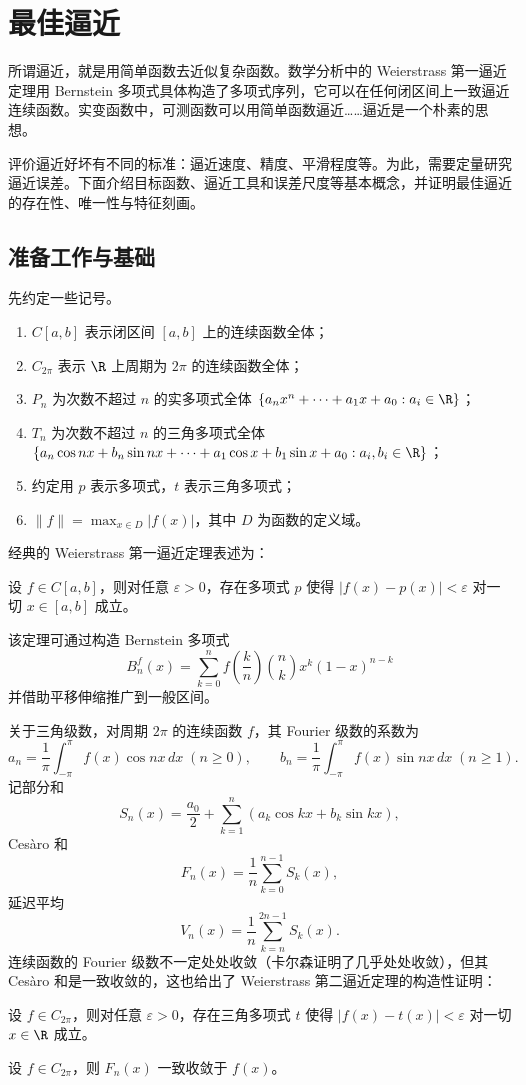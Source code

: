 \section{最佳逼近}

所谓逼近，就是用简单函数去近似复杂函数。数学分析中的 Weierstrass 第一逼近定理用 Bernstein 多项式具体构造了多项式序列，它可以在任何闭区间上一致逼近连续函数。实变函数中，可测函数可以用简单函数逼近……逼近是一个朴素的思想。

评价逼近好坏有不同的标准：逼近速度、精度、平滑程度等。为此，需要定量研究逼近误差。下面介绍目标函数、逼近工具和误差尺度等基本概念，并证明最佳逼近的存在性、唯一性与特征刻画。

\subsection{准备工作与基础}
先约定一些记号。
\begin{definition}
\begin{enumerate}
    \item $C[a,b]$ 表示闭区间 $[a,b]$ 上的连续函数全体；
    \item $C_{2\pi}$ 表示 $\R$ 上周期为 $2\pi$ 的连续函数全体；
    \item $P_n$ 为次数不超过 $n$ 的实多项式全体
    $\{a_nx^n+\cdots+a_1x+a_0: a_i\in\R\}$；
    \item $T_n$ 为次数不超过 $n$ 的三角多项式全体
    $\{a_n\cos nx+b_n\sin nx+\cdots +a_1\cos x+b_1\sin x +a_0: a_i,b_i\in\R\}$；
    \item 约定用 $p$ 表示多项式，$t$ 表示三角多项式；
    \item $\|f\| = \max_{x\in D} |f(x)|$，其中 $D$ 为函数的定义域。
\end{enumerate}
\end{definition}

经典的 Weierstrass 第一逼近定理表述为：
\begin{theorem}
设 $f\in C[a,b]$，则对任意 $\varepsilon>0$，存在多项式 $p$ 使得 $|f(x)-p(x)|<\varepsilon$ 对一切 $x\in[a,b]$ 成立。
\end{theorem}
该定理可通过构造 Bernstein 多项式
\[
B_n^f(x) = \sum_{k=0}^{n} f\left(\frac{k}{n}\right)\binom{n}{k}x^k(1-x)^{n-k}
\]
并借助平移伸缩推广到一般区间。

关于三角级数，对周期 $2\pi$ 的连续函数 $f$，其 Fourier 级数的系数为
\[
a_n = \frac{1}{\pi}\int_{-\pi}^{\pi}f(x)\cos nx\,dx\;(n\ge0),\qquad
b_n = \frac{1}{\pi}\int_{-\pi}^{\pi}f(x)\sin nx\,dx\;(n\ge1).
\]
记部分和
\[
S_n(x) = \frac{a_0}{2} + \sum_{k=1}^{n}(a_k\cos kx + b_k\sin kx),
\]
Cesàro 和
\[
F_n(x) = \frac{1}{n}\sum_{k=0}^{n-1} S_k(x),
\]
延迟平均
\[
V_n(x) = \frac{1}{n}\sum_{k=n}^{2n-1} S_k(x).
\]
连续函数的 Fourier 级数不一定处处收敛（卡尔森证明了几乎处处收敛），但其 Cesàro 和是一致收敛的，这也给出了 Weierstrass 第二逼近定理的构造性证明：
\begin{theorem}
设 $f\in C_{2\pi}$，则对任意 $\varepsilon>0$，存在三角多项式 $t$ 使得 $|f(x)-t(x)|<\varepsilon$ 对一切 $x\in\R$ 成立。
\end{theorem}
\begin{theorem}
设 $f\in C_{2\pi}$，则 $F_n(x)$ 一致收敛于 $f(x)$。
\end{theorem}

